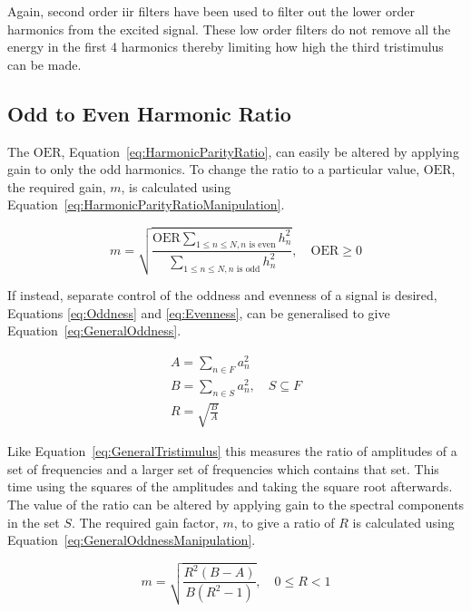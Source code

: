 		Again, second order \acrshort{iir} filters have been used to filter out the lower order harmonics from the
		excited signal.	These low order filters do not remove all the energy in the first 4 harmonics thereby
		limiting how high the third tristimulus can be made.

	\subsection{Odd to Even Harmonic Ratio}
	\label{sec:FeatureControl-Parameterisation-HarmonicParityRatio}
		The $\mathrm{OER}$, Equation~\ref{eq:HarmonicParityRatio}, can easily be altered by applying gain to only
		the odd harmonics. To change the ratio to a particular value, $\mathrm{OER}$, the required gain, $m$, is
		calculated using Equation~\ref{eq:HarmonicParityRatioManipulation}.

		\begin{equation}
			m = \sqrt{\frac{\mathrm{OER}\sum_{1 \leq n \leq N, n \text{ is even}} h_{n}^{2}}
				       {\sum_{1 \leq n \leq N, n \text{ is odd}} h_{n}^{2}}},
				       \quad \mathrm{OER} \geq 0
		       \label{eq:HarmonicParityRatioManipulation}
		\end{equation}

		If instead, separate control of the oddness and evenness of a signal is desired, Equations \ref{eq:Oddness}
		and \ref{eq:Evenness}, can be generalised to give Equation~\ref{eq:GeneralOddness}.

		\begin{gather}
			A = \sum_{n \in F} a_{n}^{2} \nonumber \\
			B = \sum_{n \in S} a_{n}^{2}, \quad S \subseteq F \nonumber \\
			R = \sqrt{\frac{B}{A}}
			\label{eq:GeneralOddness}
		\end{gather}

		Like Equation~\ref{eq:GeneralTristimulus} this measures the ratio of amplitudes of a set of frequencies and
		a larger set of frequencies which contains that set. This time using the squares of the amplitudes and
		taking the square root afterwards. The value of the ratio can be altered by applying gain to the spectral
		components in the set $S$. The required gain factor, $m$, to give a ratio of $R$ is calculated using
		Equation~\ref{eq:GeneralOddnessManipulation}.

		\begin{equation}
			m = \sqrt{\frac{R^{2}(B - A)}{B(R^{2} - 1)}}, \quad 0 \leq R < 1
			\label{eq:GeneralOddnessManipulation}
		\end{equation}

